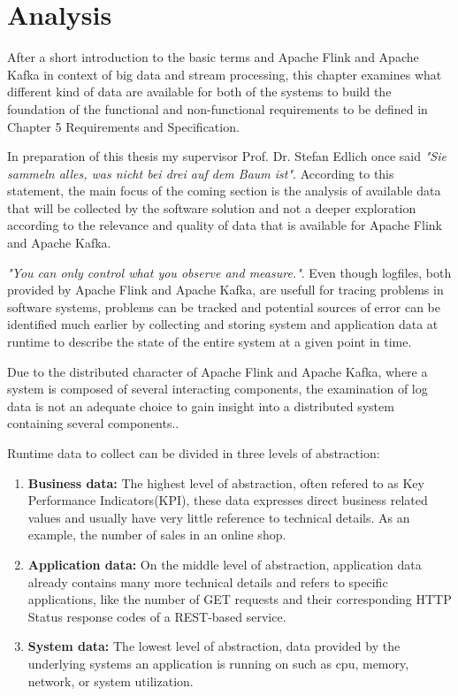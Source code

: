 \chapter{Analysis}

After a short introduction to the basic terms and Apache Flink and Apache Kafka in
context of big data and stream processing, this chapter examines what different kind of
data are available for both of the systems to build the foundation of the functional and
non-functional requirements to be defined in Chapter 5 Requirements and Specification.

In preparation of this thesis my supervisor Prof. Dr. Stefan Edlich once said \textit{"Sie sammeln
alles, was nicht bei drei auf dem Baum ist"}. According to this statement, the main focus
of the coming section is the analysis of available data that will be collected by the software
solution and not a deeper exploration according to the relevance and quality of data that
is available for Apache Flink and Apache Kafka.

\textit{"You can only control what you observe and measure."}\cite{Ebert07}. Even though logfiles, both
provided by Apache Flink and Apache Kafka, are usefull for tracing problems in software
systems, problems can be tracked and potential sources of error can be identified much
earlier by collecting and storing system and application data at runtime to describe the
state of the entire system at a given point in time.

Due to the distributed character of Apache Flink and Apache Kafka, where a system is
composed of several interacting components, the examination of log data is not an
adequate choice to gain insight into a distributed system containing several components.\cite{VanL14}.

Runtime data to collect can be divided in three levels of abstraction:

\begin{enumerate}
    \item \textbf{Business data:} The highest level of abstraction, often refered to as Key Performance
    Indicators(KPI), these data expresses direct business related values and
    usually have very little reference to technical details. As an example, the number of
    sales in an online shop.
    \item \textbf{Application data:} On the middle level of abstraction, application data already
    contains many more technical details and refers to specific applications, like the
    number of GET requests and their corresponding HTTP Status response codes of a
    REST-based service.
    \item \textbf{System data:} The lowest level of abstraction, data provided by the underlying
    systems an application is running on such as cpu, memory, network, or system utilization.
\end{enumerate}

